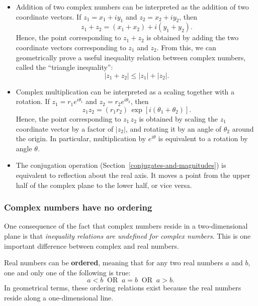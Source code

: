 \documentclass[10pt,a4paper]{article}
\begin{document}
\begin{itemize}
\item
  Addition of two complex numbers can be interpreted as the addition of
  two coordinate vectors. If $z_1 = x_1 + i y_1$ and
  $z_2 = x_2 + i y_2$, then
  \begin{equation}
    z_1 + z_2 = \left(x_1 + x_2\right) + i\left(y_1 + y_2\right).
  \end{equation}
  Hence, the point corresponding to $z_1 + z_2$ is obtained by adding
  the two coordinate vectors corresponding to $z_1$ and $z_2$. From
  this, we can geometrically prove a useful inequality relation
  between complex numbers, called the ``triangle inequality'':
  \begin{equation}
    |z_1 + z_2| \le |z_1| + |z_2|.
  \end{equation}

\item
  Complex multiplication can be interpreted as a scaling together with a
  rotation. If $z_1 = r_1e^{i\theta_1}$ and
  $z_2 = r_2e^{i\theta_2}$, then
  \begin{equation}
    z_1 z_2 = \left(r_1 r_2\right) \,\exp[i(\theta_1 + \theta_2)].
  \end{equation}
  Hence, the point corresponding to $z_1 \, z_2$ is obtained by
  scaling the $z_1$ coordinate vector by a factor of $|z_2|$, and
  rotating it by an angle of $\theta_2$ around the origin. In
  particular, multiplication by $e^{i\theta}$ is equivalent to a
  rotation by angle $\theta$.

\item
  The conjugation operation (Section~\ref{conjugates-and-magnitudes})
  is equivalent to reflection about the real axis. It moves a point
  from the upper half of the complex plane to the lower half, or vice
  versa.
\end{itemize}

\subsubsection{Complex numbers have no ordering}
\label{complex-numbers-have-no-ordering}

One consequence of the fact that complex numbers reside in a
two-dimensional plane is that \emph{inequality relations are undefined
  for complex numbers}. This is one important difference between
complex and real numbers.

Real numbers can be \textbf{ordered}, meaning that for any two real
numbers $a$ and $b$, one and only one of the following is true:
\begin{equation}
  a < b \;\; \mathrm{OR} \;\; a = b \;\; \mathrm{OR}\;\; a > b.
\end{equation}
In geometrical terms, these ordering relations exist because the real
numbers reside along a one-dimensional line.
\end{document}
